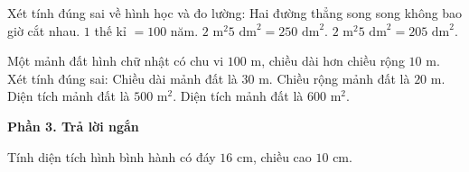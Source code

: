 \begin{ex} %
Xét tính đúng sai về hình học và đo lường:
\choiceTF
{\True Hai đường thẳng song song không bao giờ cắt nhau.}
{\True $1$ thế kỉ $= 100$ năm.}
{$2\text{ m}^2 5\text{ dm}^2 = 250\text{ dm}^2$.}
{\True $2\text{ m}^2 5\text{ dm}^2 = 205\text{ dm}^2$.}
\end{ex}

\begin{ex} %
Một mảnh đất hình chữ nhật có chu vi $100\text{ m}$, chiều dài hơn chiều rộng $10\text{ m}$. Xét tính đúng sai:
\choiceTF
{\True Chiều dài mảnh đất là $30\text{ m}$.}
{\True Chiều rộng mảnh đất là $20\text{ m}$.}
{Diện tích mảnh đất là $500\text{ m}^2$.}
{\True Diện tích mảnh đất là $600\text{ m}^2$.}
\end{ex}

\textbf{Phần 3. Trả lời ngắn}

\begin{ex} %
Tính diện tích hình bình hành có đáy $16\text{ cm}$, chiều cao $10\text{ cm}$.
\end{ex}

